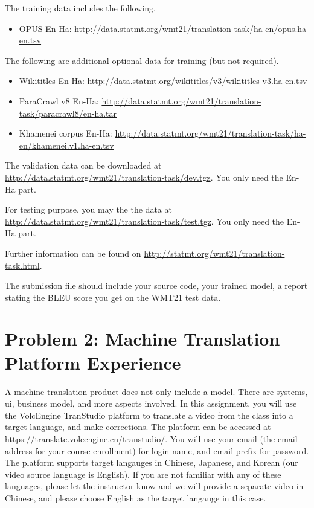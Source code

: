 \documentclass[12pt,letterpaper]{article}
\begin{document}
The training data includes the following.
\begin{itemize}
  \item OPUS En-Ha:
  \url{http://data.statmt.org/wmt21/translation-task/ha-en/opus.ha-en.tsv}
\end{itemize}

The following are additional optional data for training (but not required).
\begin{itemize}
  \item Wikititles En-Ha:
  \url{http://data.statmt.org/wikititles/v3/wikititles-v3.ha-en.tsv}
  \item ParaCrawl v8 En-Ha:
  \url{http://data.statmt.org/wmt21/translation-task/paracrawl8/en-ha.tar}
  \item Khamenei corpus En-Ha:
  \url{http://data.statmt.org/wmt21/translation-task/ha-en/khamenei.v1.ha-en.tsv}
\end{itemize}

The validation data can be downloaded at \url{http://data.statmt.org/wmt21/translation-task/dev.tgz}.
You only need the En-Ha part.

For testing purpose, you may the the data at \url{http://data.statmt.org/wmt21/translation-task/test.tgz}. You only need the En-Ha part. 

Further information can be found on \url{http://statmt.org/wmt21/translation-task.html}.

The submission file should include your source code, your trained model, a report stating the BLEU score you get on the WMT21 test data. 

\section*{Problem 2: Machine Translation Platform Experience} 
A machine translation product does not only include a model. There are systems, ui, business model, and more aspects involved. 
In this assignment, you will use the VolcEngine TranStudio platform to translate a video from the class into a target language, and make corrections. 
The platform can be accessed at \url{https://translate.volcengine.cn/transtudio/}. You will use your email (the email address for your course enrollment) for login name, and email prefix for password. 
The platform supports target langauges in Chinese, Japanese, and Korean (our video source language is English).  If you are not familiar with any of these languages, please let the instructor know and we will provide a separate video in Chinese, and please choose English as the target langauge in this case. 
\end{document}
